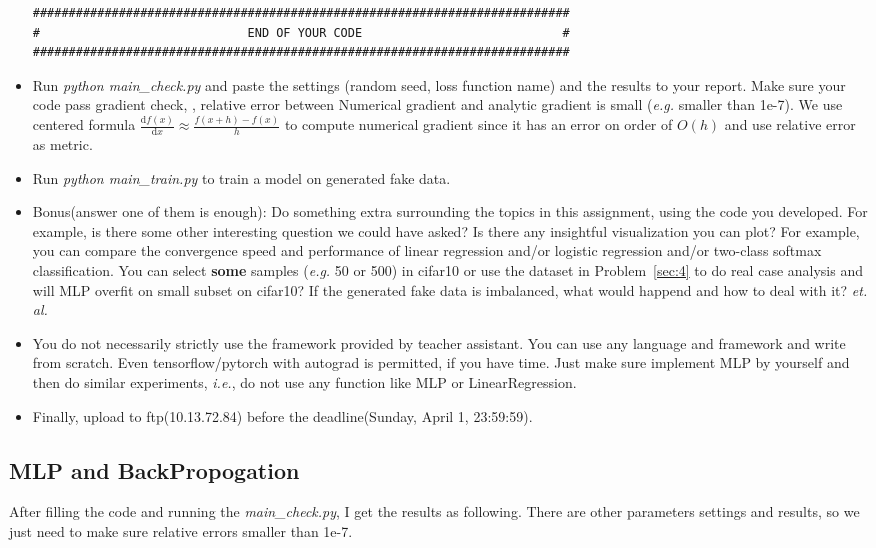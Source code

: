 \documentclass[12pt]{article}
\begin{document}
\begin{itemize}
\begin{verbatim}
###########################################################################
#                             END OF YOUR CODE                            #
###########################################################################
	\end{verbatim}
	\item Run \textit{python main\_check.py} and paste the settings (\eg random seed, loss function name) and the results to  your report.  Make sure your code pass gradient check, \eg, relative error between Numerical gradient and analytic gradient is small (\textit{e.g.} smaller than 1e-7). We use centered formula $\displaystyle \frac{\mathrm{d}f(x)}{\mathrm{d}x} \approx \frac{f(x+h)-f(x)}{h}$ to compute numerical gradient since it has an error on order of $O(h)$ and use relative error as metric.
	\item Run \textit{python main\_train.py} to train a model on generated fake data.
	\item {{Bonus(answer one of them is enough)}}: Do something extra surrounding the topics in this assignment, using the code you developed. For example, is there some other interesting question we could have asked? Is there any insightful visualization you can plot? For example, you can compare the convergence speed and performance of  linear regression and/or logistic regression and/or two-class softmax classification. You can select \textbf{some} samples (\textit{e.g.} 50 or 500) in cifar10 or use the dataset in {Problem~\ref{sec:4}} to do real case analysis and will MLP overfit on small subset on cifar10? If the generated fake data is imbalanced, what would happend and how to deal with it?  \textit{et. al.}
	\item You do not necessarily strictly use the framework provided by teacher assistant. You can use any language and framework and write from scratch.
	      Even tensorflow/pytorch with autograd is permitted, if you have time.
	      Just make sure implement MLP by yourself and then do similar experiments, \textit{i.e.}, do not use any function like MLP or LinearRegression.
	\item Finally, upload to ftp(10.13.72.84) before the deadline(Sunday, April 1, 23:59:59).
\end{itemize}

\subsection{MLP and BackPropogation} 

After filling the code and running the \textit{main\_check.py}, I get the results as following. There are other parameters settings and results, so we just need to make sure relative errors smaller than 1e-7. 
\end{document}
